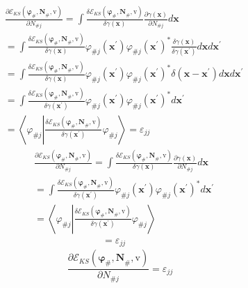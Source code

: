 \documentclass[aps,preprint]{revtex4}%
\begin{document}
\begin{align*}
&  \frac{\partial\mathcal{E}_{KS}\left(  \mathbf{\varphi}_{\#}\mathbf{,N}%
_{\#}\mathbf{,}\mathrm{v}\right)  }{\partial N_{\#j}}=\int\frac{\delta
\mathcal{E}_{KS}\left(  \mathbf{\varphi}_{\#}\mathbf{,N}_{\#}\mathbf{,}%
\mathrm{v}\right)  }{\delta\gamma\left(  \mathbf{x}\right)  }\frac
{\partial\gamma\left(  \mathbf{x}\right)  }{\partial N_{\#j}}d\mathbf{x}\\
&  =\int\frac{\delta\mathcal{E}_{KS}\left(  \mathbf{\varphi}_{\#}%
\mathbf{,N}_{\#}\mathbf{,}\mathrm{v}\right)  }{\delta\gamma\left(
\mathbf{x}\right)  }\varphi_{\#j}\left(  \mathbf{x}^{\prime}\right)
\varphi_{\#j}\left(  \mathbf{x}^{\prime}\right)  ^{\ast}\frac{\delta
\gamma\left(  \mathbf{x}\right)  }{\delta\gamma\left(  \mathbf{x}^{\prime
}\right)  }d\mathbf{x}d\mathbf{x}^{\prime}\\
&  =\int\frac{\delta\mathcal{E}_{KS}\left(  \mathbf{\varphi}_{\#}%
\mathbf{,N}_{\#}\mathbf{,}\mathrm{v}\right)  }{\delta\gamma\left(
\mathbf{x}\right)  }\varphi_{\#j}\left(  \mathbf{x}^{\prime}\right)
\varphi_{\#j}\left(  \mathbf{x}^{\prime}\right)  ^{\ast}\delta\left(
\mathbf{x-x}^{\prime}\right)  d\mathbf{x}d\mathbf{x}^{\prime}\\
&  =\int\frac{\delta\mathcal{E}_{KS}\left(  \mathbf{\varphi}_{\#}%
\mathbf{,N}_{\#}\mathbf{,}\mathrm{v}\right)  }{\delta\gamma\left(
\mathbf{x}^{\prime}\right)  }\varphi_{\#j}\left(  \mathbf{x}^{\prime}\right)
\varphi_{\#j}\left(  \mathbf{x}^{\prime}\right)  ^{\ast}d\mathbf{x}^{\prime}\\
&  =\left\langle \varphi_{\#j}\left\vert \frac{\delta\mathcal{E}_{KS}\left(
\mathbf{\varphi}_{\#}\mathbf{,N}_{\#}\mathbf{,}\mathrm{v}\right)  }%
{\delta\gamma\left(  \mathbf{x}^{\prime}\right)  }\right.  \varphi
_{\#j}\right\rangle =\varepsilon_{jj}%
\end{align*}%
\begin{align*}
&  \frac{\partial\mathcal{E}_{KS}\left(  \mathbf{\varphi}_{\#}\mathbf{,N}%
_{\#}\mathbf{,}\mathrm{v}\right)  }{\partial N_{\#j}}=\int\frac{\delta
\mathcal{E}_{KS}\left(  \mathbf{\varphi}_{\#}\mathbf{,N}_{\#}\mathbf{,}%
\mathrm{v}\right)  }{\delta\gamma\left(  \mathbf{x}\right)  }\frac
{\partial\gamma\left(  \mathbf{x}\right)  }{\partial N_{\#j}}d\mathbf{x}\\
&  =\int\frac{\delta\mathcal{E}_{KS}\left(  \mathbf{\varphi}_{\#}%
\mathbf{,N}_{\#}\mathbf{,}\mathrm{v}\right)  }{\delta\gamma\left(
\mathbf{x}^{\prime}\right)  }\varphi_{\#j}\left(  \mathbf{x}^{\prime}\right)
\varphi_{\#j}\left(  \mathbf{x}^{\prime}\right)  ^{\ast}d\mathbf{x}^{\prime}\\
&  =\left\langle \varphi_{\#j}\left\vert \frac{\delta\mathcal{E}_{KS}\left(
\mathbf{\varphi}_{\#}\mathbf{,N}_{\#}\mathbf{,}\mathrm{v}\right)  }%
{\delta\gamma\left(  \mathbf{x}^{\prime}\right)  }\right.  \varphi
_{\#j}\right\rangle \\
&  \qquad\qquad\qquad\quad=\varepsilon_{jj}%
\end{align*}%
\[
\frac{\partial\mathcal{E}_{KS}\left(  \mathbf{\varphi}_{\#}\mathbf{,N}%
_{\#}\mathbf{,}\mathrm{v}\right)  }{\partial N_{\#j}}=\varepsilon_{jj}%
\]
\end{document}
